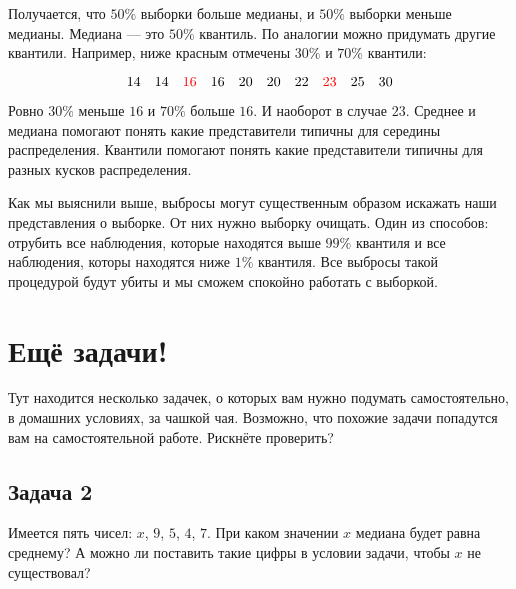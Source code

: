 \documentclass[12pt, a4paper, oneside]{article}
\begin{document}
{\begin{enumerate}
	Получается, что $50\%$ выборки больше медианы, и $50\%$ выборки меньше медианы. Медиана --- это $50\%$ квантиль. По аналогии можно придумать другие квантили. Например, ниже красным отмечены $30\%$ и $70\%$ квантили: 
	
	\[
	14 \quad 14  \quad {\color{red}16 } \quad 16  \quad 20  \quad 20  \quad 22  \quad {\color{red}{23}}  \quad 25  \quad 30
	\]
	
	Ровно $30\%$ меньше $16$ и $70\%$ больше $16$. И наоборот в случае $23$. Среднее и медиана помогают понять какие представители типичны для середины распределения. Квантили помогают понять какие представители типичны для разных кусков распределения. 

	Как мы выяснили выше, выбросы могут существенным образом искажать наши представления о выборке. От них нужно выборку очищать. Один из способов: отрубить все наблюдения, которые находятся выше $99\%$ квантиля и все наблюдения, которы находятся ниже $1\%$ квантиля. Все выбросы такой процедурой будут убиты и мы сможем спокойно работать с выборкой. 

\end{enumerate}
}

\section*{Ещё задачи!} 

Тут находится несколько задачек, о которых вам нужно подумать самостоятельно, в домашних условиях, за чашкой чая.  Возможно, что похожие задачи попадутся вам на самостоятельной работе. Рискнёте проверить?

\subsection*{Задача 2}

Имеется пять чисел: $x$, $9$, $5$, $4$, $7$. При каком значении $x$ медиана будет равна среднему? А можно ли поставить такие цифры в условии задачи, чтобы $x$ не существовал?

\end{document}
